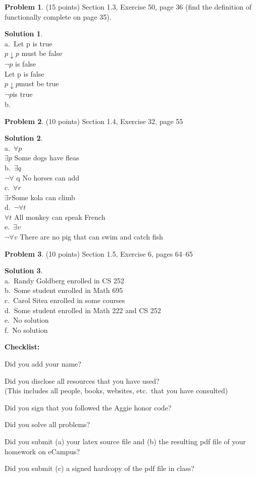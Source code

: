 \documentclass{article}
\theoremstyle{definition}
\newtheorem{problem}{Problem}
\newtheorem*{solution}{Solution}
\newcommand{\checklist}{\noindent\textbf{Checklist:}
\begin{compactenum}
\item Did you add your name? 
\item Did you disclose all resources that you have used? \\
(This includes all people, books, websites, etc.\ that you have consulted)
\item Did you sign that you followed the Aggie honor code? 
\item Did you solve all problems? 
\item Did you submit (a) your latex source file and (b) the resulting pdf file
  of your homework on eCampus?
\item Did you submit (c) a signed hardcopy of the pdf file in class? 
\end{compactenum}
}
\begin{document}
\begin{problem} (15 points)
Section 1.3, Exercise 50, page 36 (find the definition of functionally complete on page 35). 
\end{problem}
\begin{solution}~\\
a.\ Let p is true\\
   $p \downarrow p$ must be false\\
   $\neg p$ is false\\
   Let p is false\\
   $p \downarrow p $must be true\\
   $\neg p $is true\\
b.\ 
\end{solution}

\begin{problem} (10 points)
Section 1.4, Exercise 32, page 55
\end{problem}
\begin{solution}~\\
a.\ $\forall p$ \\
   $\exists p $ Some dogs have fleas\\
b.\ $\exists q $\\
   $\neg \forall$ q No horses can add\\
c.\ $\forall r$\\
   $\exists r$Some kola can climb\\
d.\ $\neg \forall t$\\
   $\forall t$ All monkey can speak French\\
e.\ $\exists v$\\
   $\neg \forall v$ There are no pig that can swim and catch fish\\
\end{solution}

\begin{problem} (10 points)
Section 1.5, Exercise 6, pages 64--65
\end{problem}
\begin{solution}~\\
a.\ Randy Goldberg enrolled in CS 252\\
b.\ Some student enrolled in Math 695\\
c.\ Carol Sitea enrolled in some courses\\
d.\ Some student enrolled in Math 222 and CS 252\\
e.\ No solution\\
f.\ No solution\\
\end{solution}

\goodbreak
\checklist
\end{document}
